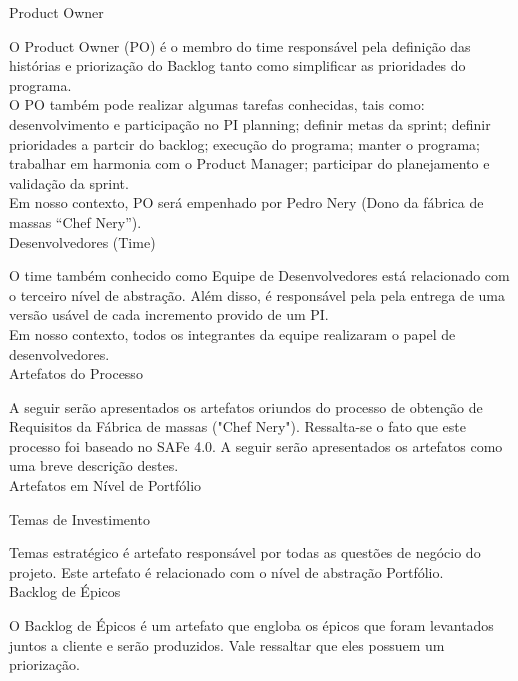\large{Product Owner\\}

\tab O Product Owner (PO) é o membro do time responsável pela definição das histórias e priorização do Backlog tanto como simplificar as prioridades do programa. \\
\tab O PO também pode realizar algumas tarefas conhecidas, tais como: desenvolvimento e participação no PI planning; definir metas da sprint; definir prioridades  a partcir do backlog; execução do programa; manter o programa; trabalhar em harmonia com o Product Manager; participar do planejamento e validação da sprint. \\
\tab Em nosso contexto, PO será empenhado por Pedro Nery (Dono da fábrica de massas “Chef Nery”). \\


\large{Desenvolvedores (Time)\\}

\tab O time também conhecido como Equipe de Desenvolvedores está relacionado com o terceiro nível de abstração. Além disso, é responsável pela pela entrega de uma versão usável de cada incremento provido de um PI. \\
\tab Em nosso contexto, todos os integrantes da equipe realizaram o papel de desenvolvedores. \\


\large{Artefatos do Processo \\}

\tab A seguir serão apresentados os artefatos oriundos do processo de obtenção de Requisitos da Fábrica de massas ("Chef Nery"). Ressalta-se o fato que este processo foi baseado no SAFe 4.0. A seguir serão apresentados os artefatos como uma breve descrição destes. \\


\large{Artefatos em Nível de Portfólio \\}

\large{Temas de Investimento \\}

\tab Temas estratégico é artefato responsável por todas as questões de negócio do projeto. Este artefato é relacionado com o nível de abstração Portfólio. \\




\large{Backlog de  Épicos \\}

\tab O Backlog de Épicos é um artefato que engloba os épicos que foram levantados juntos a cliente e serão produzidos. Vale ressaltar que eles possuem um priorização. \\


